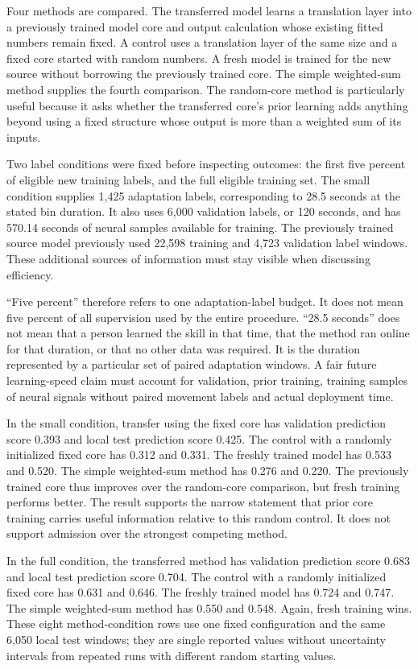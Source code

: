 Four methods are compared. The transferred model learns a translation layer into a previously trained model core and output calculation whose existing fitted numbers remain fixed. A control uses a translation layer of the same size and a fixed core started with random numbers. A fresh model is trained for the new source without borrowing the previously trained core. The simple weighted-sum method supplies the fourth comparison. The random-core method is particularly useful because it asks whether the transferred core's prior learning adds anything beyond using a fixed structure whose output is more than a weighted sum of its inputs.

Two label conditions were fixed before inspecting outcomes: the first five percent of eligible new training labels, and the full eligible training set. The small condition supplies 1,425 adaptation labels, corresponding to 28.5 seconds at the stated bin duration. It also uses 6,000 validation labels, or 120 seconds, and has 570.14 seconds of neural samples available for training. The previously trained source model previously used 22,598 training and 4,723 validation label windows. These additional sources of information must stay visible when discussing efficiency.

``Five percent'' therefore refers to one adaptation-label budget. It does not mean five percent of all supervision used by the entire procedure. ``28.5 seconds'' does not mean that a person learned the skill in that time, that the method ran online for that duration, or that no other data was required. It is the duration represented by a particular set of paired adaptation windows. A fair future learning-speed claim must account for validation, prior training, training samples of neural signals without paired movement labels and actual deployment time.

In the small condition, transfer using the fixed core has validation prediction score 0.393 and local test prediction score 0.425. The control with a randomly initialized fixed core has 0.312 and 0.331. The freshly trained model has 0.533 and 0.520. The simple weighted-sum method has 0.276 and 0.220. The previously trained core thus improves over the random-core comparison, but fresh training performs better. The result supports the narrow statement that prior core training carries useful information relative to this random control. It does not support admission over the strongest competing method.

In the full condition, the transferred method has validation prediction score 0.683 and local test prediction score 0.704. The control with a randomly initialized fixed core has 0.631 and 0.646. The freshly trained model has 0.724 and 0.747. The simple weighted-sum method has 0.550 and 0.548. Again, fresh training wins. These eight method-condition rows use one fixed configuration and the same 6,050 local test windows; they are single reported values without uncertainty intervals from repeated runs with different random starting values.

